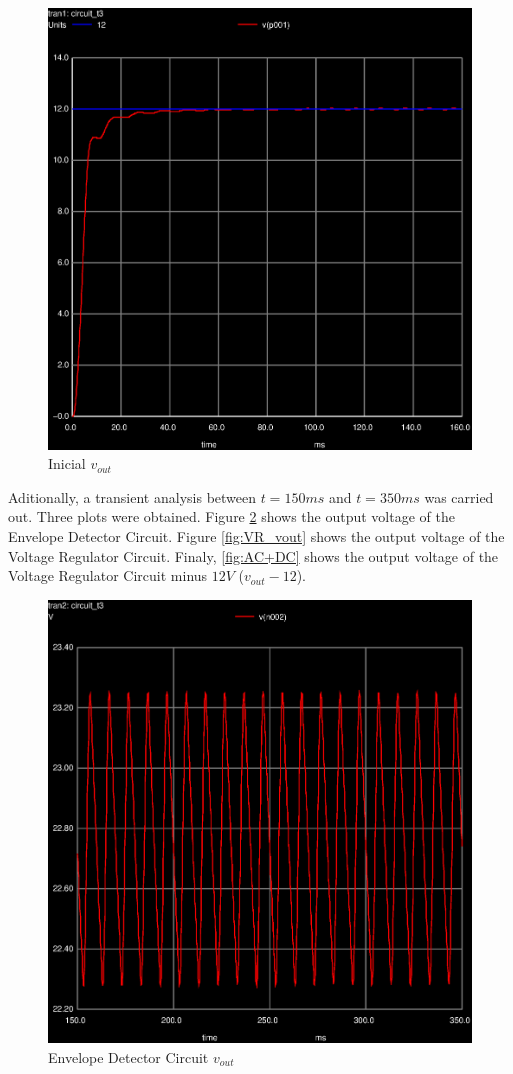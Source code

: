 \begin{figure}[ht]
	\centering
	\includegraphics[width=0.5\linewidth]{trans-vout_vr_all.eps}
	\caption{Inicial $v_{out}$}
\label{fig:graph_global}
\end{figure}


Aditionally, a transient analysis between $t=150ms$ and $t=350ms$ was carried out. Three plots
were obtained. Figure \ref{fig:EV_vout} shows the output voltage of the Envelope Detector
Circuit. Figure \ref{fig:VR_vout} shows the output voltage of the Voltage Regulator Circuit.
Finaly, \ref{fig:AC+DC} shows the output voltage of the Voltage Regulator Circuit minus $12V$
($v_{out}-12$).


\begin{figure}[ht]
	\centering
	\includegraphics[width=0.6\linewidth]{trans-vout_ed.eps}
	\caption{Envelope Detector Circuit $v_{out}$}
\label{fig:EV_vout}
\end{figure}

